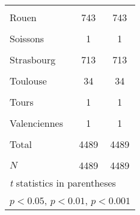 {\begin{tabular}{l*{2}{c}}
            &                     &                     \\
[1em]
Rouen       &         743         &         743         \\
            &                     &                     \\
[1em]
Soissons    &           1         &           1         \\
            &                     &                     \\
[1em]
Strasbourg  &         713         &         713         \\
            &                     &                     \\
[1em]
Toulouse    &          34         &          34         \\
            &                     &                     \\
[1em]
Tours       &           1         &           1         \\
            &                     &                     \\
[1em]
Valenciennes&           1         &           1         \\
            &                     &                     \\
[1em]
Total       &        4489         &        4489         \\
            &                     &                     \\
\hline
\(N\)       &        4489         &        4489         \\
\hline\hline
\multicolumn{3}{l}{\footnotesize \textit{t} statistics in parentheses}\\
\multicolumn{3}{l}{\footnotesize \sym{*} \(p<0.05\), \sym{**} \(p<0.01\), \sym{***} \(p<0.001\)}\\
\end{tabular}
}
